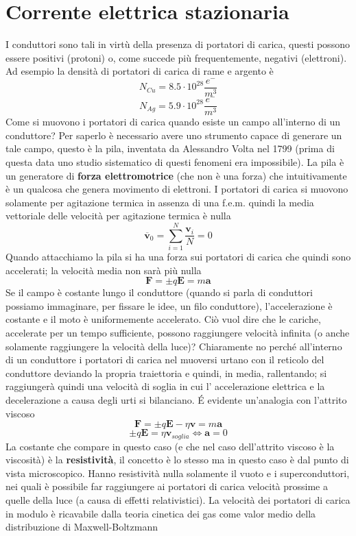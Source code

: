 \documentclass[
10pt, %
a4paper, %
oneside, %
headinclude,footinclude, %
BCOR5mm, %
]{scrartcl}
\begin{document}
\section{Corrente elettrica stazionaria}
I conduttori sono tali in virtù della presenza di portatori di carica, questi possono essere positivi (protoni) o, come succede più frequentemente, negativi (elettroni). Ad esempio la densità di portatori di carica di rame e argento è
\[N_{Cu} = 8.5 \cdot 10^{28}\frac{e^-}{m^3}\]
\[N_{Ag} = 5.9\cdot 10^{28}\frac{e^-}{m^3}\]
Come si muovono i portatori di carica quando esiste un campo all'interno di un conduttore? Per saperlo è necessario avere uno strumento capace di generare un tale campo, questo è la pila, inventata da Alessandro Volta nel 1799 (prima di questa data uno studio sistematico di questi fenomeni era impossibile). La pila è un generatore di \textbf{forza elettromotrice} (che non è una forza) che intuitivamente è un qualcosa che genera movimento di elettroni. I portatori di carica si muovono solamente per agitazione termica in assenza di una f.e.m. quindi la media vettoriale delle velocità per agitazione termica è nulla
\[\mathbf{\overline{v}}_0= \sum_{i = 1}^{N}\frac{\mathbf{v}_i}{N}=0\]
Quando attacchiamo la pila si ha una forza sui portatori di carica che quindi sono accelerati; la velocità media non sarà più nulla
\[\mathbf{F}= \pm q\mathbf{E}= m \mathbf{a}\]
Se il campo è costante lungo il conduttore (quando si parla di conduttori possiamo immaginare, per fissare le idee, un filo conduttore), l'accelerazione è costante e il moto è uniformemente accelerato. Ciò vuol dire che le cariche, accelerate per un tempo sufficiente, possono raggiungere velocità infinita (o anche solamente raggiungere la velocità della luce)? Chiaramente no perché all'interno di un conduttore i portatori di carica nel muoversi urtano con il reticolo del conduttore deviando la propria traiettoria e quindi, in media, rallentando; si raggiungerà quindi una velocità di soglia in cui l' accelerazione elettrica e la decelerazione a causa degli urti si bilanciano. \'E evidente un'analogia con l'attrito viscoso
\[\mathbf{F} = \pm q\mathbf{E}-\eta\mathbf{v}=m\mathbf{a}\]
\[\pm q\mathbf{E}=\eta\mathbf{v}_{soglia} \Leftrightarrow \mathbf{a}= 0\]
La costante che compare in questo caso (e che nel caso dell'attrito viscoso è la viscosità) è la \textbf{resistività}, il concetto è lo stesso ma in questo caso è dal punto di vista microscopico. Hanno resistività nulla solamente il vuoto e i superconduttori, nei quali è possibile far raggiungere ai portatori di carica velocità prossime a quelle della luce (a causa di effetti relativistici). La velocità dei portatori di carica in modulo è ricavabile dalla teoria cinetica dei gas come valor medio della distribuzione di Maxwell-Boltzmann
\end{document}
